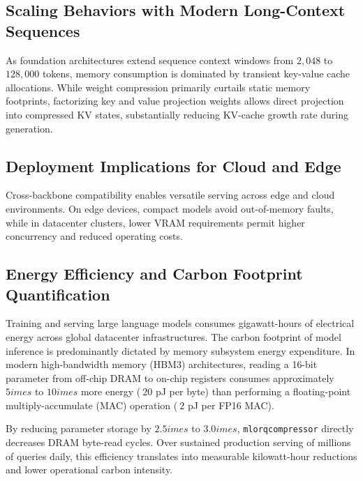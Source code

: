 \subsection{Scaling Behaviors with Modern Long-Context Sequences}
As foundation architectures extend sequence context windows from $2{,}048$ to $128{,}000$ tokens, memory consumption is dominated by transient key-value cache allocations. While weight compression primarily curtails static memory footprints, factorizing key and value projection weights allows direct projection into compressed KV states, substantially reducing KV-cache growth rate during generation.

\subsection{Deployment Implications for Cloud and Edge}
Cross-backbone compatibility enables versatile serving across edge and cloud environments. On edge devices, compact models avoid out-of-memory faults, while in datacenter clusters, lower VRAM requirements permit higher concurrency and reduced operating costs.

\subsection{Energy Efficiency and Carbon Footprint Quantification}
Training and serving large language models consumes gigawatt-hours of electrical energy across global datacenter infrastructures. The carbon footprint of model inference is predominantly dictated by memory subsystem energy expenditure. In modern high-bandwidth memory (HBM3) architectures, reading a 16-bit parameter from off-chip DRAM to on-chip registers consumes approximately $5	imes$ to $10	imes$ more energy ($~20$ pJ per byte) than performing a floating-point multiply-accumulate (MAC) operation ($~2$ pJ per FP16 MAC).

By reducing parameter storage by $2.5	imes$ to $3.0	imes$, \texttt{mlorqcompressor} directly decreases DRAM byte-read cycles. Over sustained production serving of millions of queries daily, this efficiency translates into measurable kilowatt-hour reductions and lower operational carbon intensity.
